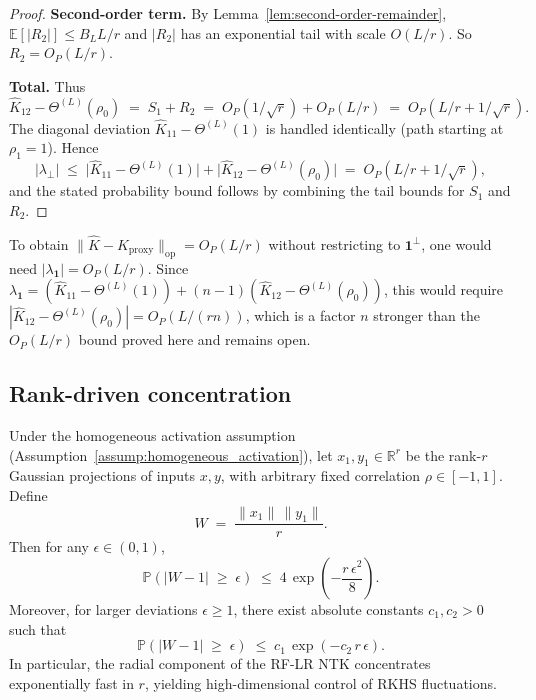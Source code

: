 \begin{proof}
\medskip
\noindent\textbf{Second-order term.} By Lemma~\ref{lem:second-order-remainder}, \(\mathbb{E}[|R_2|]\le B_L L/r\) and \(|R_2|\) has an exponential tail with scale \(O(L/r)\). So \(R_2=O_P(L/r)\).

\medskip
\noindent\textbf{Total.} Thus
\[
\hat{K}_{12}-\Theta^{(L)}(\rho_0) \;=\; S_1+R_2 \;=\; O_P(1/\sqrt{r})+O_P(L/r) \;=\; O_P(L/r+1/\sqrt{r}).
\]
The diagonal deviation \(\hat{K}_{11}-\Theta^{(L)}(1)\) is handled identically (path starting at \(\rho_1=1\)). Hence
\[
|\lambda_\perp| \;\le\; \bigl|\hat{K}_{11}-\Theta^{(L)}(1)\bigr| + \bigl|\hat{K}_{12}-\Theta^{(L)}(\rho_0)\bigr| \;=\; O_P(L/r+1/\sqrt{r}),
\]
and the stated probability bound follows by combining the tail bounds for \(S_1\) and \(R_2\).
\end{proof}

\begin{remark}\label{rmk:equicorrelated-full-op}
To obtain \(\|\hat{K}-K_{\mathrm{proxy}}\|_{\mathrm{op}}=O_P(L/r)\) without restricting to \(\mathbf{1}^\perp\), one would need \(|\lambda_{\mathbf{1}}|=O_P(L/r)\). Since \(\lambda_{\mathbf{1}}=(\hat{K}_{11}-\Theta^{(L)}(1))+(n-1)(\hat{K}_{12}-\Theta^{(L)}(\rho_0))\), this would require \(|\hat{K}_{12}-\Theta^{(L)}(\rho_0)|=O_P(L/(rn))\), which is a factor \(n\) stronger than the \(O_P(L/r)\) bound proved here and remains open.
\end{remark}

\subsection{Rank-driven concentration}
\label{appendix:proof-rkhs-rank-concentration}

\begin{theorem}\label{thm:rkhs_rank_concentration}
Under the homogeneous activation assumption (Assumption~\ref{assump:homogeneous_activation}), let \( x_1,y_1\in\mathbb{R}^r \) be the rank-\(r\) Gaussian projections of inputs \(x,y\), with arbitrary fixed correlation \( \rho\in[-1,1] \). Define
\[
W \;=\; \frac{\|x_1\|\,\|y_1\|}{r}.
\]
Then for any \( \epsilon\in(0,1) \),
\[
\mathbb{P}\!\left(\left|W-1\right|\;\ge\;\epsilon\right)\;\le\;4\,\exp\!\left(-\frac{r\,\epsilon^2}{8}\right).
\]
Moreover, for larger deviations \( \epsilon\ge 1 \), there exist absolute constants \(c_1,c_2>0\) such that
\[
\mathbb{P}\!\left(\left|W-1\right|\;\ge\;\epsilon\right)\;\le\;c_1\,\exp\!\left(-c_2\,r\,\epsilon\right).
\]
In particular, the radial component of the RF-LR NTK concentrates exponentially fast in \(r\), yielding high-dimensional control of RKHS fluctuations.
\end{theorem}

